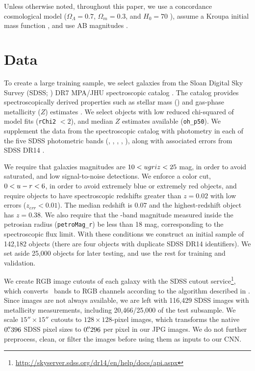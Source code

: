 \documentclass[fleqn,usenatbib]{mnras}
\begin{document}
Unless otherwise noted, throughout this paper, we use a concordance cosmological model ($\Omega_\Lambda = 0.7$, $\Omega_m = 0.3$, and $H_0= 70$ \kms{} \permpc), assume a Kroupa initial mass function \citep{Kroupa2001}, and use AB magnitudes \citep{Oke1974}.


\section{Data} \label{sec:data}
To create a large training sample, we select galaxies from the Sloan Digital Sky Survey (SDSS; \citealt{York2000}) DR7 MPA/JHU spectroscopic catalog \citep{Kauffmann2003a, Brinchmann2004, Tremonti2004, Salim2007}. The catalog provides spectroscopically derived properties such as stellar mass (\mstar) and gas-phase metallicity ($Z$) estimates \citep{Tremonti2004}. We select objects with low reduced chi-squared of model fits (\texttt{rChi2} $< 2$), and median $Z$ estimates available (\texttt{oh\_p50}). We supplement the data from the spectroscopic catalog with photometry in each of the five SDSS photometric bands (\sdssu, \sdssg, \sdssr, \sdssi, \sdssz), along with associated errors from SDSS DR14 \citep{Abolfathi2017}.

We require that galaxies magnitudes are $10 < \hbox{$u$} \hbox{$g$} \hbox{$r$} \hbox{$i$} \hbox{$z$} < 25$ mag, in order to avoid saturated, and low signal-to-noise detections. We enforce a color cut, $0 < \hbox{$u$}-\hbox{$r$} < 6$, in order to avoid extremely blue or extremely red objects, and require objects to have spectroscopic redshifts greater than $z=0.02$ with low errors ($z_{err} < 0.01$). The median redshift is $0.07$ and the highest-redshift object has $z = 0.38$. We also require that the \sdssr-band magnitude measured inside the petrosian radius (\texttt{petroMag\_r}) be less than 18 mag, corresponding to the spectroscopic flux limit.
With these conditions we construct an initial sample of 142,182 objects (there are four objects with duplicate SDSS DR14 identifiers).
We set aside 25,000 objects for later testing, and use the rest for training and validation.

We create RGB image cutouts of each galaxy with the SDSS cutout service\footnote{\url{http://skyserver.sdss.org/dr14/en/help/docs/api.aspx}}, which converts \sdssg\sdssr\sdssi\ bands to RGB channels according to the algorithm described in \cite[][with modifications by the SDSS SkyServer team]{Lupton2004}. Since images are not always available, we are left with 116,429 SDSS images with metallicity measurements, including 20,466/25,000 of the test subsample. We scale $15''\times15''$ cutouts to $128\times128$-pixel images, which transforms the native $0\hbox{$.\!\!^{\prime\prime}$}396$ SDSS pixel sizes to $0\hbox{$.\!\!^{\prime\prime}$}296$ per pixel in our JPG images. We do not further preprocess, clean, or filter the images before using them as inputs to our CNN.
\end{document}
